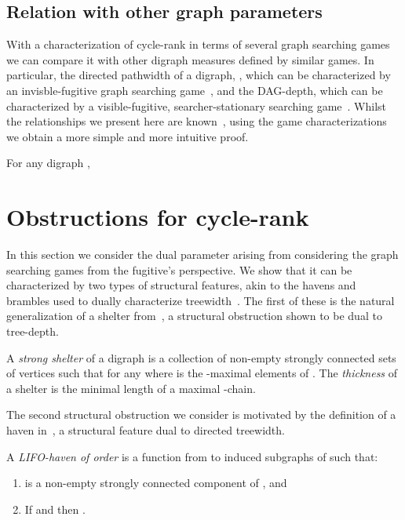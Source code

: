 \documentclass{llncs}
\begin{document}
\subsection{Relation with other graph parameters}
With a characterization of cycle-rank in terms of several graph searching games we can compare it with other digraph measures defined by similar games.  
In particular, the directed pathwidth of a digraph, , which can be characterized by an invisble-fugitive graph searching game~\cite{Bar05}, and the DAG-depth,  which can be characterized by a visible-fugitive, searcher-stationary searching game~\cite{GHKLOR09}.
Whilst the relationships we present here are known~\cite{Gru08,GHKLOR09}, using the game characterizations we obtain a more simple and more intuitive proof.  
\begin{corollary}
For any digraph , 

\end{corollary}


\section{Obstructions for cycle-rank}\label{sec:min-max}








In this section we consider the dual parameter arising from considering the graph searching games from the fugitive's perspective.  We show that it can be characterized by two types of structural features, akin to the havens and brambles used to dually characterize treewidth~\cite{ST93}.  The first of these is the natural generalization of a shelter from~\cite{GT11}, a structural obstruction shown to be dual to tree-depth.

\begin{definition}
A \emph{strong shelter} of a digraph  is a collection  of non-empty strongly connected sets of vertices such that for any  
  where  is the -maximal elements of .  
The \emph{thickness} of a shelter  is the minimal length of a maximal -chain.
\end{definition}


The second structural obstruction we consider is motivated by the definition of a haven in~\cite{JRST01}, a structural feature dual to directed treewidth.

\begin{definition}
A \emph{LIFO-haven of order } is a function  from  to induced subgraphs of  such that:
\begin{enumerate}[(H1) ]
\item  is a non-empty strongly connected component of , and
\item If  and  then .
\end{enumerate}
\end{definition}
\end{document}
